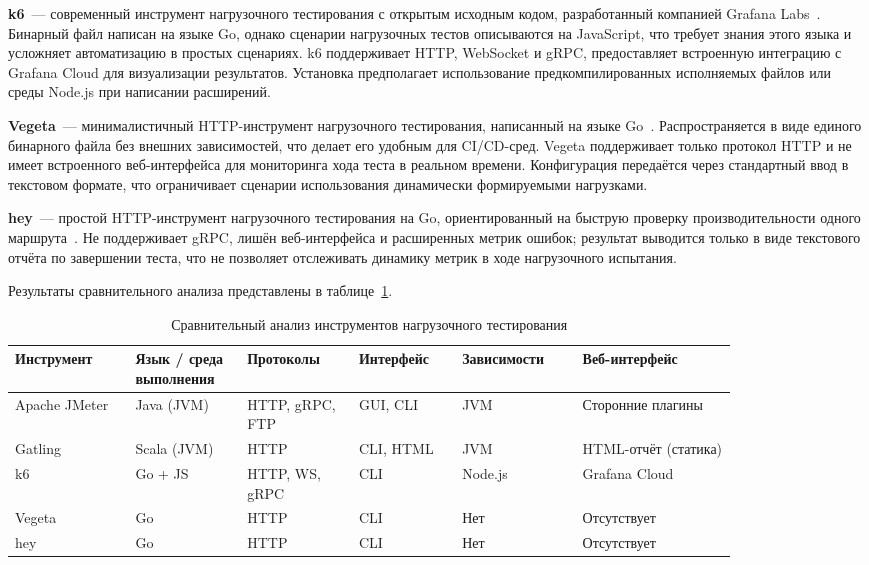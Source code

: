 \textbf{k6}~--- современный инструмент нагрузочного тестирования с открытым исходным
кодом, разработанный компанией Grafana Labs~\cite{k6}.
Бинарный файл написан на языке Go, однако сценарии нагрузочных тестов описываются
на JavaScript, что требует знания этого языка и усложняет автоматизацию
в простых сценариях.
k6 поддерживает HTTP, WebSocket и gRPC, предоставляет встроенную интеграцию с Grafana
Cloud для визуализации результатов.
Установка предполагает использование предкомпилированных исполняемых файлов или среды Node.js
при написании расширений.

\textbf{Vegeta}~--- минималистичный HTTP-инструмент нагрузочного тестирования,
написанный на языке Go~\cite{vegeta}.
Распространяется в виде единого бинарного файла без внешних зависимостей,
что делает его удобным для CI/CD-сред.
Vegeta поддерживает только протокол HTTP и не имеет встроенного веб-интерфейса
для мониторинга хода теста в реальном времени.
Конфигурация передаётся через стандартный ввод в текстовом формате,
что ограничивает сценарии использования динамически формируемыми нагрузками.

\textbf{hey}~--- простой HTTP-инструмент нагрузочного тестирования на Go,
ориентированный на быструю проверку производительности одного маршрута~\cite{hey}.
Не поддерживает gRPC, лишён веб-интерфейса и расширенных метрик ошибок;
результат выводится только в виде текстового отчёта по завершении теста,
что не позволяет отслеживать динамику метрик в ходе нагрузочного испытания.

Результаты сравнительного анализа представлены в таблице~\ref{tab:ch1-tools}.

\begin{table}[h!]
  \centering
  \caption{Сравнительный анализ инструментов нагрузочного тестирования}
  \label{tab:ch1-tools}
  \small
  \begin{tabular}{|p{0.14\linewidth}|p{0.13\linewidth}|p{0.13\linewidth}|p{0.12\linewidth}|p{0.14\linewidth}|p{0.18\linewidth}|}
    \hline
    \textbf{Инструмент} & \textbf{Язык / среда выполнения} & \textbf{Протоколы} & \textbf{Интерфейс} & \textbf{Зависимости} & \textbf{Веб-интерфейс} \\
    \hline
    Apache JMeter  & Java (JVM)     & HTTP, gRPC, FTP & GUI, CLI  & JVM               & Сторонние плагины \\
    \hline
    Gatling        & Scala (JVM)    & HTTP            & CLI, HTML & JVM               & HTML-отчёт (статика) \\
    \hline
    k6             & Go + JS        & HTTP, WS, gRPC  & CLI       & Node.js           & Grafana Cloud \\
    \hline
    Vegeta         & Go             & HTTP            & CLI       & Нет               & Отсутствует \\
    \hline
    hey            & Go             & HTTP            & CLI       & Нет               & Отсутствует \\
    \hline
  \end{tabular}
\end{table}

